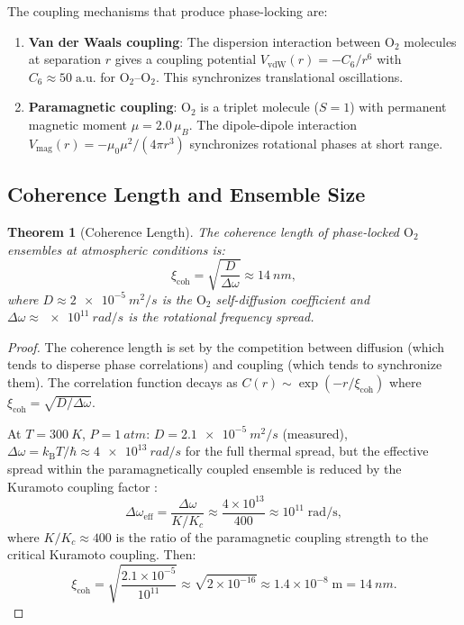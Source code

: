 \documentclass[12pt]{article}
\newtheorem{theorem}{Theorem}[section]
\theoremstyle{definition}
\theoremstyle{remark}
\newcommand{\kB}{k_{\mathrm{B}}}
\newcommand{\xicoh}{\xi_{\mathrm{coh}}}
\begin{document}
The coupling mechanisms that produce phase-locking are:

\begin{enumerate}[label=(\roman*)]
  \item \textbf{Van der Waals coupling}: The dispersion interaction between $\mathrm{O}_2$ molecules at separation $r$ gives a coupling potential $V_{\mathrm{vdW}}(r) = -C_6/r^6$ with $C_6 \approx 50\;\mathrm{a.u.}$ for $\mathrm{O}_2$--$\mathrm{O}_2$. This synchronizes translational oscillations.

  \item \textbf{Paramagnetic coupling}: $\mathrm{O}_2$ is a triplet molecule ($S = 1$) with permanent magnetic moment $\mu = 2.0\,\mu_B$. The dipole-dipole interaction $V_{\mathrm{mag}}(r) = -\mu_0 \mu^2/(4\pi r^3)$ synchronizes rotational phases at short range.
\end{enumerate}

\subsection{Coherence Length and Ensemble Size}

\begin{theorem}[Coherence Length]
\label{thm:coherence}
The coherence length of phase-locked $\mathrm{O}_2$ ensembles at atmospheric conditions is:
\begin{equation}
  \xicoh = \sqrt{\frac{D}{\Delta\omega}} \approx \SI{14}{nm},
  \label{eq:coherence_length}
\end{equation}
where $D \approx \SI{2e-5}{m^2/s}$ is the $\mathrm{O}_2$ self-diffusion coefficient and $\Delta\omega \approx \SI{e11}{rad/s}$ is the rotational frequency spread.
\end{theorem}

\begin{proof}
The coherence length is set by the competition between diffusion (which tends to disperse phase correlations) and coupling (which tends to synchronize them). The correlation function decays as $C(r) \sim \exp(-r/\xicoh)$ where $\xicoh = \sqrt{D/\Delta\omega}$.

At $T = \SI{300}{K}$, $P = \SI{1}{atm}$: $D = \SI{2.1e-5}{m^2/s}$ (measured), $\Delta\omega = \kB T/\hbar \approx \SI{4e13}{rad/s}$ for the full thermal spread, but the effective spread within the paramagnetically coupled ensemble is reduced by the Kuramoto coupling factor \cite{kuramoto1984chemical}:
\begin{equation}
  \Delta\omega_{\mathrm{eff}} = \frac{\Delta\omega}{K/K_c} \approx \frac{4 \times 10^{13}}{400} \approx 10^{11}\;\mathrm{rad/s},
  \label{eq:delta_omega_eff}
\end{equation}
where $K/K_c \approx 400$ is the ratio of the paramagnetic coupling strength to the critical Kuramoto coupling. Then:
\begin{equation}
  \xicoh = \sqrt{\frac{2.1 \times 10^{-5}}{10^{11}}} \approx \sqrt{2 \times 10^{-16}} \approx 1.4 \times 10^{-8}\;\mathrm{m} = \SI{14}{nm}.
  \label{eq:xi_calc}
\end{equation}
\end{proof}
\end{document}
